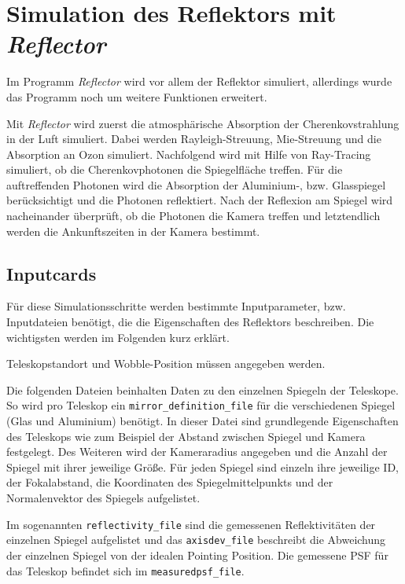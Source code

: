 \section{Simulation des Reflektors mit \textit{Reflector}}
\label{sec:Reflector}
Im Programm \textit{Reflector}\cite{Reflector} wird vor allem der Reflektor simuliert, allerdings wurde das Programm noch um weitere Funktionen erweitert.

Mit \textit{Reflector} wird zuerst die atmosphärische Absorption der Cherenkovstrahlung in der Luft simuliert. 
Dabei werden Rayleigh-Streuung, Mie-Streuung und die Absorption an Ozon simuliert.
Nachfolgend wird mit Hilfe von Ray-Tracing simuliert, ob die Cherenkovphotonen die Spiegelfläche treffen.
Für die auftreffenden Photonen wird die Absorption der Aluminium-, bzw. Glasspiegel berücksichtigt und die Photonen reflektiert.
Nach der Reflexion am Spiegel wird nacheinander überprüft, ob die Photonen die Kamera treffen und letztendlich werden die Ankunftszeiten in der Kamera bestimmt.

\subsection{Inputcards}
Für diese Simulationsschritte werden bestimmte Inputparameter, bzw. Inputdateien benötigt, die die Eigenschaften des Reflektors beschreiben.
Die wichtigsten werden im Folgenden kurz erklärt.


Teleskopstandort und Wobble-Position müssen angegeben werden.

Die folgenden Dateien beinhalten Daten zu den einzelnen Spiegeln der Teleskope.
So wird pro Teleskop ein \texttt{mirror\_definition\_file} für die verschiedenen Spiegel (Glas und Aluminium) benötigt.
In dieser Datei sind grundlegende Eigenschaften des Teleskops wie zum Beispiel der Abstand zwischen Spiegel und Kamera festgelegt. 
Des Weiteren wird der Kameraradius angegeben und die Anzahl der Spiegel mit ihrer jeweilige Größe.
Für jeden Spiegel sind einzeln ihre jeweilige ID, der Fokalabstand, die Koordinaten des Spiegelmittelpunkts und der Normalenvektor des Spiegels aufgelistet.

Im sogenannten \texttt{reflectivity\_file} sind die gemessenen Reflektivitäten der einzelnen Spiegel aufgelistet und das \texttt{axisdev\_file} beschreibt die Abweichung der einzelnen Spiegel von der idealen Pointing Position.
Die gemessene PSF für das Teleskop befindet sich im \texttt{measuredpsf\_file}.

